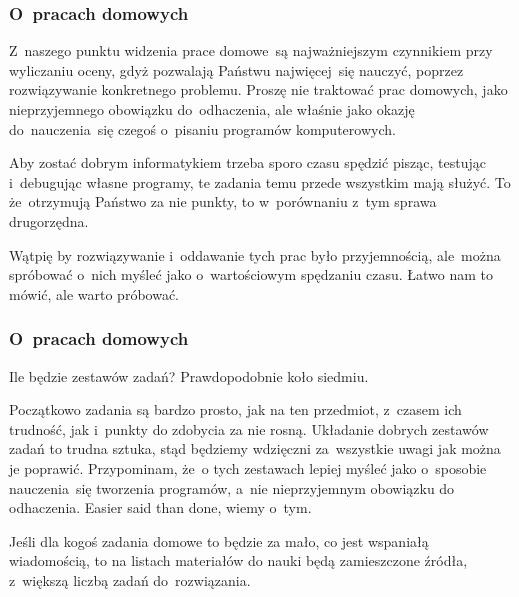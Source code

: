 \documentclass[10pt,t]{beamer}
\begin{document}
\begin{frame}
  \frametitle{O~pracach domowych}


  Z~naszego punktu widzenia prace domowe~są najważniejszym czynnikiem
  przy wyliczaniu oceny, gdyż pozwalają Państwu najwięcej~się nauczyć,
  poprzez rozwiązywanie konkretnego problemu. Proszę nie traktować prac
  domowych, jako nieprzyjemnego obowiązku do~odhaczenia, ale właśnie jako
  okazję do~nauczenia~się czegoś o~pisaniu programów komputerowych.

  Aby zostać dobrym informatykiem trzeba sporo czasu spędzić pisząc,
  testując i~debugując własne programy, te zadania temu przede wszystkim
  mają służyć. To że~otrzymują Państwo za nie punkty, to w~porównaniu z~tym
  sprawa drugorzędna.

  Wątpię by rozwiązywanie i~oddawanie tych prac było przyjemnością,
  ale~można spróbować o~nich myśleć jako o~wartościowym spędzaniu czasu.
  Łatwo nam to mówić, ale warto próbować.

\end{frame}





\begin{frame}
  \frametitle{O~pracach domowych}


  Ile będzie zestawów zadań? Prawdopodobnie koło siedmiu.

  Początkowo zadania są bardzo prosto, jak na ten przedmiot, z~czasem ich
  trudność, jak i~punkty do zdobycia za nie rosną. Układanie dobrych
  zestawów zadań to trudna sztuka, stąd będziemy wdzięczni za~wszystkie
  uwagi jak można je poprawić. Przypominam, że~o tych zestawach lepiej
  myśleć jako o~sposobie nauczenia~się tworzenia programów, a~nie
  nieprzyjemnym obowiązku do odhaczenia. Easier said than done, wiemy o~tym.

  Jeśli dla kogoś zadania domowe to będzie za mało, co jest wspaniałą
  wiadomością, to na listach materiałów do nauki będą zamieszczone źródła,
  z~większą liczbą zadań do~rozwiązania.

\end{frame}
\end{document}

